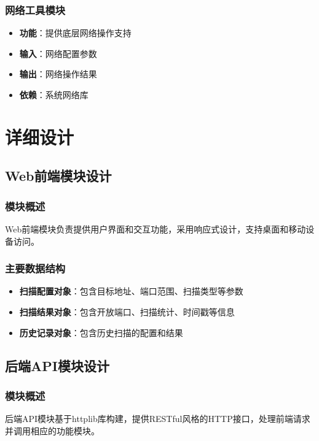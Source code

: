 \documentclass[12pt,hyperref,a4paper,UTF8]{ctexart}
\begin{document}
\subsubsection{网络工具模块}
\begin{itemize}
    \item \textbf{功能}：提供底层网络操作支持
    \item \textbf{输入}：网络配置参数
    \item \textbf{输出}：网络操作结果
    \item \textbf{依赖}：系统网络库
\end{itemize}

\section{详细设计}

\subsection{Web前端模块设计}

\subsubsection{模块概述}
Web前端模块负责提供用户界面和交互功能，采用响应式设计，支持桌面和移动设备访问。

\subsubsection{主要数据结构}
\begin{itemize}
    \item \textbf{扫描配置对象}：包含目标地址、端口范围、扫描类型等参数
    \item \textbf{扫描结果对象}：包含开放端口、扫描统计、时间戳等信息
    \item \textbf{历史记录对象}：包含历史扫描的配置和结果
\end{itemize}



\subsection{后端API模块设计}

\subsubsection{模块概述}
后端API模块基于httplib库构建，提供RESTful风格的HTTP接口，处理前端请求并调用相应的功能模块。
\end{document}

